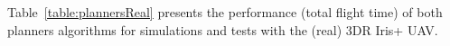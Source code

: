 \documentclass[conference]{IEEEtran}
\begin{document}


Table~\ref{table:plannersReal} presents the performance (total flight time) of both planners algorithms for simulations and tests with the (real) 3DR Iris+ UAV.
\end{document}
